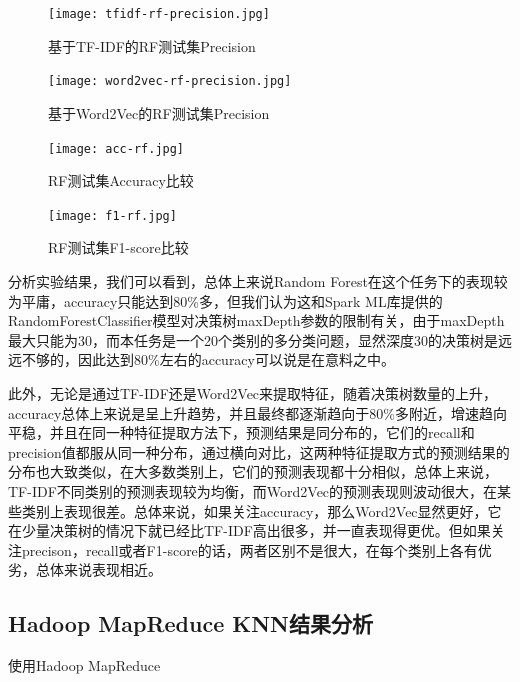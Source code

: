 \documentclass[lang=cn,11pt]{elegantpaper}
\begin{document}
  \begin{figure}[H]
    \begin{minipage}[t]{0.5\linewidth}
    \centering
    \texttt{[image: tfidf-rf-precision.jpg]}
    \caption{基于TF-IDF的RF测试集Precision}
    \label{fig:side:a}
    \end{minipage}
    \begin{minipage}[t]{0.5\linewidth}
    \centering
    \texttt{[image: word2vec-rf-precision.jpg]}
    \caption{基于Word2Vec的RF测试集Precision}
    \label{fig:side:b}
    \end{minipage}
    \end{figure}

    \begin{figure}[H]
      \begin{minipage}[t]{0.5\linewidth}
      \centering
      \texttt{[image: acc-rf.jpg]}
      \caption{RF测试集Accuracy比较}
      \label{fig:side:a}
      \end{minipage}
      \begin{minipage}[t]{0.5\linewidth}
      \centering
      \texttt{[image: f1-rf.jpg]}
      \caption{RF测试集F1-score比较}
      \label{fig:side:b}
      \end{minipage}
    \end{figure}
分析实验结果，我们可以看到，总体上来说Random Forest在这个任务下的表现较为平庸，accuracy只能达到80\%多，但我们认为这和Spark ML库提供的RandomForestClassifier模型对决策树maxDepth参数的限制有关，由于maxDepth最大只能为30，而本任务是一个20个类别的多分类问题，显然深度30的决策树是远远不够的，因此达到80\%左右的accuracy可以说是在意料之中。\par
此外，无论是通过TF-IDF还是Word2Vec来提取特征，随着决策树数量的上升，accuracy总体上来说是呈上升趋势，并且最终都逐渐趋向于80\%多附近，增速趋向平稳，并且在同一种特征提取方法下，预测结果是同分布的，它们的recall和precision值都服从同一种分布，通过横向对比，这两种特征提取方式的预测结果的分布也大致类似，在大多数类别上，它们的预测表现都十分相似，总体上来说，TF-IDF不同类别的预测表现较为均衡，而Word2Vec的预测表现则波动很大，在某些类别上表现很差。总体来说，如果关注accuracy，那么Word2Vec显然更好，它在少量决策树的情况下就已经比TF-IDF高出很多，并一直表现得更优。但如果关注precison，recall或者F1-score的话，两者区别不是很大，在每个类别上各有优劣，总体来说表现相近。
\subsection{Hadoop MapReduce KNN结果分析}
使用Hadoop MapReduce
\end{document}
